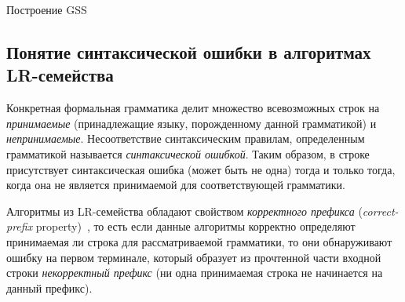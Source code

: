 \begin{algorithm}[H]
\begin{algorithmic}[1]
\caption{Построение GSS}
\label{gss_construction}
   
  \Else
    \EndFor
  \EndIf
\EndFunction

    \EndIf
      \EndFor
    \EndIf
  \EndIf
\EndFunction
\end{algorithmic}
\end{algorithm}

\subsection{Понятие синтаксической ошибки в алгоритмах LR-семейства}
Конкретная формальная грамматика делит множество всевозможных строк на \emph{принимаемые} (принадлежащие языку, порожденному данной грамматикой) и \emph{непринимаемые}. Несоответствие синтаксическим правилам, определенным грамматикой называется  \emph{синтаксической ошибкой}. Таким образом, в строке присутствует синтаксическая ошибка (может быть не одна) тогда и только тогда, когда она не является принимаемой для соответствующей грамматики.

Алгоритмы из LR-семейства обладают свойством \emph{корректного префикса} (\emph{correct-prefix} property)~\cite{Grune}, то есть если данные алгоритмы корректно определяют принимаемая ли строка для рассматриваемой грамматики, то они обнаруживают ошибку на первом терминале, который образует из прочтенной части входной строки \emph{некорректный префикс} (ни одна принимаемая строка не начинается на данный префикс).

